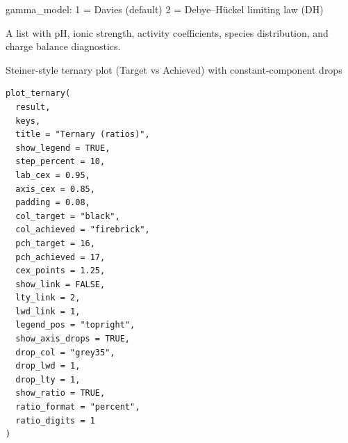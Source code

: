 \documentclass[a4paper]{book}
\begin{document}
%
\begin{Details}
gamma\_model:
1 = Davies (default)
2 = Debye–Hückel limiting law (DH)
\end{Details}
%
\begin{Value}
A list with pH, ionic strength, activity coefficients, species
distribution, and charge balance diagnostics.
\end{Value}
%
\begin{Description}
Steiner-style ternary plot (Target vs Achieved) with constant-component drops
\end{Description}
%
\begin{Usage}
\begin{verbatim}
plot_ternary(
  result,
  keys,
  title = "Ternary (ratios)",
  show_legend = TRUE,
  step_percent = 10,
  lab_cex = 0.95,
  axis_cex = 0.85,
  padding = 0.08,
  col_target = "black",
  col_achieved = "firebrick",
  pch_target = 16,
  pch_achieved = 17,
  cex_points = 1.25,
  show_link = FALSE,
  lty_link = 2,
  lwd_link = 1,
  legend_pos = "topright",
  show_axis_drops = TRUE,
  drop_col = "grey35",
  drop_lwd = 1,
  drop_lty = 1,
  show_ratio = TRUE,
  ratio_format = "percent",
  ratio_digits = 1
)
\end{verbatim}
\end{Usage}
%
\end{document}
